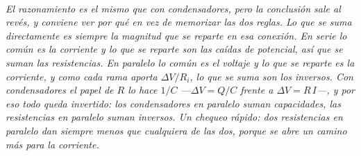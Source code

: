 \begin{center}
\begin{tikzpicture}[scale=0.95]
\end{tikzpicture}\\[0.5em]
{\small\itshape El razonamiento es el mismo que con condensadores, pero la
conclusión sale al revés, y conviene ver por qué en vez de memorizar las dos
reglas. Lo que se suma directamente es siempre la magnitud que se \emph{reparte}
en esa conexión. En serie lo común es la corriente y lo que se reparte son las
caídas de potencial, así que se suman las resistencias. En paralelo lo común es
el voltaje y lo que se reparte es la corriente, y como cada rama aporta
$\Delta V/R_i$, lo que se suma son los inversos. Con condensadores el papel de
$R$ lo hace $1/C$ ---$\Delta V = Q/C$ frente a $\Delta V = R\,I$---, y por eso
todo queda invertido: los condensadores en paralelo suman capacidades, las
resistencias en paralelo suman inversos. Un chequeo rápido: dos resistencias en
paralelo dan siempre \emph{menos} que cualquiera de las dos, porque se abre un
camino más para la corriente.}
\end{center}
